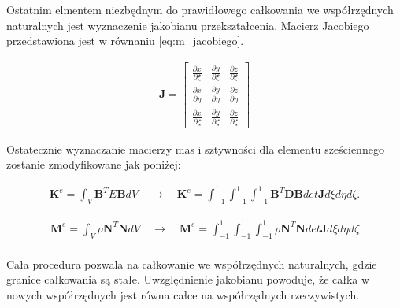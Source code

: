 Ostatnim elmentem niezbędnym do prawidłowego całkowania we współrzędnych naturalnych jest wyznaczenie jakobianu przekształcenia. Macierz Jacobiego przedstawiona jest w równaniu \ref{eq:m_jacobiego}.

\begin{gather} \label{eq:m_jacobiego}
	\textbf{J} = \begin{bmatrix} 
	 	\frac{\partial x}{\partial \xi} & \frac{\partial y}{\partial \xi} & \frac{\partial z}{\partial \xi} \\
	 	\frac{\partial x}{\partial \eta} & \frac{\partial y}{\partial \eta} & \frac{\partial z}{\partial \eta} \\
	 	\frac{\partial x}{\partial \zeta} & \frac{\partial y}{\partial \zeta} & \frac{\partial z}{\partial \zeta}
	\end{bmatrix}
\end{gather}

Ostatecznie wyznaczanie macierzy mas i sztywności dla elementu sześciennego zostanie zmodyfikowane jak poniżej:

\begin{equation} \label{eq:macierz_sztywnosci}
	\begin{aligned}
	\textbf{K}^e = \int_V {\textbf{B}}^T E \textbf{B} dV \quad \rightarrow \quad \textbf{K}^e =  \int_{-1}^1 \int_{-1}^1 \int_{-1}^1  {\textbf{B}}^T \textbf{D} \textbf{B} det\textbf{J} d\xi d\eta d\zeta.
	\end{aligned}
\end{equation}

\begin{equation} \label{eq:macierz_mas}
	\begin{aligned}
	\textbf{M}^e = \int_V \rho {\textbf{N}}^T \textbf{N} dV \quad \rightarrow \quad \textbf{M}^e = \int_{-1}^1 \int_{-1}^1 \int_{-1}^1 \rho {\textbf{N}}^T \textbf{N} det\textbf{J} d\xi d\eta d\zeta \\
	\end{aligned}
\end{equation}

Cała procedura pozwala na całkowanie we współrzędnych naturalnych, gdzie granice całkowania są stałe. Uwzględnienie jakobianu powoduje, że całka w nowych współrzędnych jest równa całce na współrzędnych rzeczywistych.





















